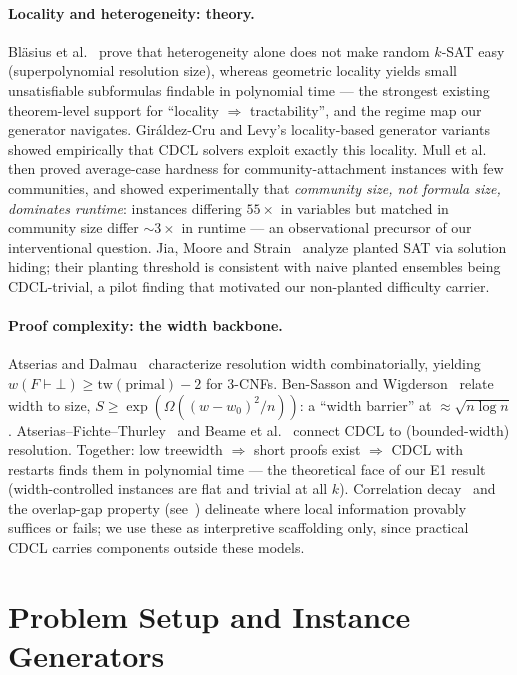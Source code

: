 \documentclass[11pt]{article}
\begin{document}
\paragraph{Locality and heterogeneity: theory.}
Bl\"asius et al.~\cite{blasius2022} prove that heterogeneity alone does not
make random $k$-SAT easy (superpolynomial resolution size), whereas geometric
locality yields small unsatisfiable subformulas findable in polynomial time ---
the strongest existing theorem-level support for ``locality $\Rightarrow$
tractability'', and the regime map our generator navigates. Gir\'aldez-Cru
and Levy's locality-based generator variants~\cite{giraldez2017} showed
empirically that CDCL solvers exploit exactly this locality. Mull et al.~\cite{mull2016} then proved average-case hardness for
community-attachment instances with few communities, and showed
experimentally that \emph{community size, not formula size, dominates
runtime}: instances differing $55\times$ in variables but matched in community
size differ ${\sim}3\times$ in runtime --- an observational precursor of our
interventional question. Jia, Moore and Strain~\cite{jia2005} analyze planted
SAT via solution hiding; their planting threshold is consistent with naive planted
ensembles being CDCL-trivial, a pilot finding that motivated our non-planted
difficulty carrier.

\paragraph{Proof complexity: the width backbone.}
Atserias and Dalmau~\cite{atserias2008} characterize resolution width
combinatorially, yielding $w(F\vdash\bot) \ge \mathrm{tw}(\text{primal}) - 2$
for 3-CNFs.
Ben-Sasson and Wigderson~\cite{ben1999} relate width to size,
$S \ge \exp(\Omega((w-w_0)^2/n))$: a ``width barrier'' at
${\approx}\sqrt{n\log n}$. Atserias--Fichte--Thurley~\cite{atserias2011} and
Beame et al.~\cite{beame2003} connect CDCL to (bounded-width) resolution.
Together: low treewidth $\Rightarrow$ short proofs exist $\Rightarrow$
CDCL with restarts finds them in polynomial time --- the theoretical face of
our E1 result (width-controlled instances are flat and trivial at all $k$).
Correlation decay~\cite{weitz2006} and the overlap-gap property
(see~\cite{gamarnik2021}) delineate where local information provably suffices
or fails; we use these as interpretive scaffolding only, since practical CDCL
carries components outside these models.

\section{Problem Setup and Instance Generators}
\label{sec:setup}
\end{document}
